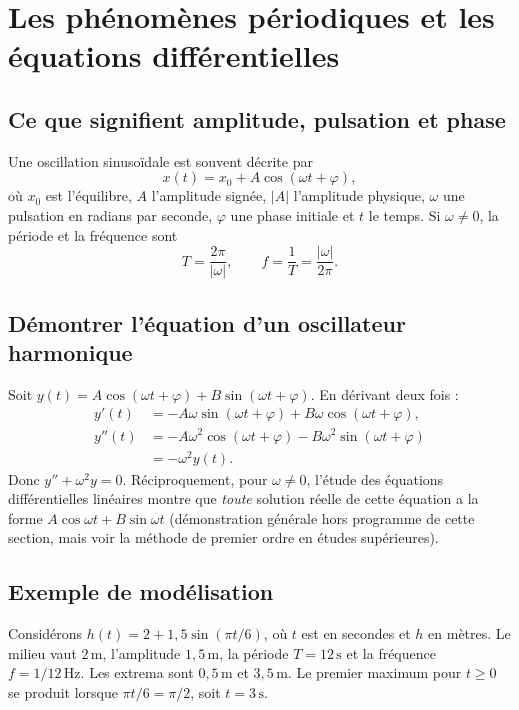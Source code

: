 \documentclass[../cours_spe_trigo.tex]{subfiles}
\begin{document}
\setcounter{chapter}{15}
\chapter{Les phénomènes périodiques et les équations différentielles}
\section{Ce que signifient amplitude, pulsation et phase}
Une oscillation sinusoïdale est souvent décrite par
\[x(t)=x_0+A\cos(\omega t+\varphi),\]
où $x_0$ est l'équilibre, $A$ l'amplitude signée, $|A|$ l'amplitude physique, $\omega$ une pulsation en radians par seconde, $\varphi$ une phase initiale et $t$ le temps. Si $\omega\ne0$, la période et la fréquence sont
\[\boxed{T=\frac{2\pi}{|\omega|},\qquad f=\frac1T=\frac{|\omega|}{2\pi}.}\]
\section{Démontrer l'équation d'un oscillateur harmonique}
Soit $y(t)=A\cos(\omega t+\varphi)+B\sin(\omega t+\varphi)$. En dérivant deux fois :
\[
\begin{aligned}
y'(t)&=-A\omega\sin(\omega t+\varphi)+B\omega\cos(\omega t+\varphi),\\
y''(t)&=-A\omega^2\cos(\omega t+\varphi)-B\omega^2\sin(\omega t+\varphi)\\
&=-\omega^2y(t).
\end{aligned}
\]
Donc $\boxed{y''+\omega^2y=0}$. Réciproquement, pour $\omega\ne0$, l'étude des équations différentielles linéaires montre que \emph{toute} solution réelle de cette équation a la forme $A\cos\omega t+B\sin\omega t$ (démonstration générale hors programme de cette section, mais voir la méthode de premier ordre en études supérieures).
\section{Exemple de modélisation}
Considérons $h(t)=2+1{,}5\sin(\pi t/6)$, où $t$ est en secondes et $h$ en mètres. Le milieu vaut $2\,\mathrm m$, l'amplitude $1{,}5\,\mathrm m$, la période $T=12\,\mathrm s$ et la fréquence $f=1/12\,\mathrm{Hz}$. Les extrema sont $0{,}5\,\mathrm m$ et $3{,}5\,\mathrm m$. Le premier maximum pour $t\ge0$ se produit lorsque $\pi t/6=\pi/2$, soit $t=3\,\mathrm s$.
\end{document}
